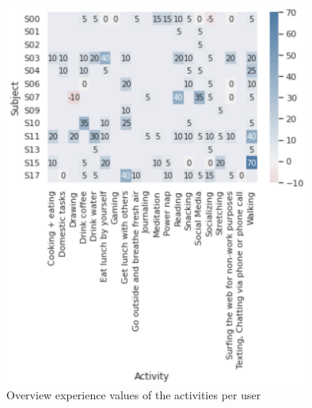 \documentclass{hasel_thesis}
\begin{document}
\begin{figure}[htp]
    \centering
    \includegraphics[width=10cm]{hasel_thesis/images/activities.png}
    \caption{Overview experience values of the activities per user}
    \label{fig:activity_ratings}
\end{figure}
\end{document}
